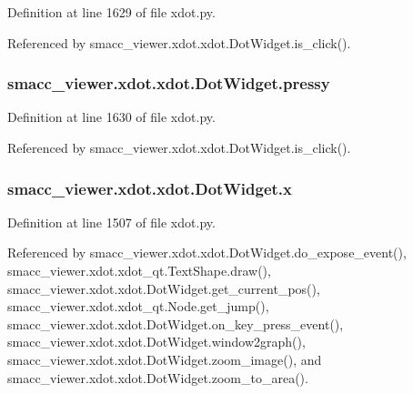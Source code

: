 Definition at line 1629 of file xdot.\+py.



Referenced by smacc\+\_\+viewer.\+xdot.\+xdot.\+Dot\+Widget.\+is\+\_\+click().

\subsubsection[{\texorpdfstring{pressy}{pressy}}]{\setlength{\rightskip}{0pt plus 5cm}smacc\+\_\+viewer.\+xdot.\+xdot.\+Dot\+Widget.\+pressy}\hypertarget{classsmacc__viewer_1_1xdot_1_1xdot_1_1DotWidget_a9dd737f3e46e9e8bc81132068f4dcff5}{}\label{classsmacc__viewer_1_1xdot_1_1xdot_1_1DotWidget_a9dd737f3e46e9e8bc81132068f4dcff5}


Definition at line 1630 of file xdot.\+py.



Referenced by smacc\+\_\+viewer.\+xdot.\+xdot.\+Dot\+Widget.\+is\+\_\+click().

\subsubsection[{\texorpdfstring{x}{x}}]{\setlength{\rightskip}{0pt plus 5cm}smacc\+\_\+viewer.\+xdot.\+xdot.\+Dot\+Widget.\+x}\hypertarget{classsmacc__viewer_1_1xdot_1_1xdot_1_1DotWidget_a828aac52a08d67c493696b074b6326da}{}\label{classsmacc__viewer_1_1xdot_1_1xdot_1_1DotWidget_a828aac52a08d67c493696b074b6326da}


Definition at line 1507 of file xdot.\+py.



Referenced by smacc\+\_\+viewer.\+xdot.\+xdot.\+Dot\+Widget.\+do\+\_\+expose\+\_\+event(), smacc\+\_\+viewer.\+xdot.\+xdot\+\_\+qt.\+Text\+Shape.\+draw(), smacc\+\_\+viewer.\+xdot.\+xdot.\+Dot\+Widget.\+get\+\_\+current\+\_\+pos(), smacc\+\_\+viewer.\+xdot.\+xdot\+\_\+qt.\+Node.\+get\+\_\+jump(), smacc\+\_\+viewer.\+xdot.\+xdot.\+Dot\+Widget.\+on\+\_\+key\+\_\+press\+\_\+event(), smacc\+\_\+viewer.\+xdot.\+xdot.\+Dot\+Widget.\+window2graph(), smacc\+\_\+viewer.\+xdot.\+xdot.\+Dot\+Widget.\+zoom\+\_\+image(), and smacc\+\_\+viewer.\+xdot.\+xdot.\+Dot\+Widget.\+zoom\+\_\+to\+\_\+area().


